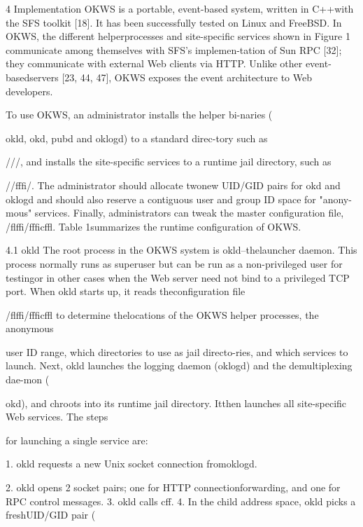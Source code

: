 4 Implementation
OKWS is a portable, event-based system, written in C++with the SFS toolkit [18]. It has been successfully tested
on Linux and FreeBSD. In OKWS, the different helperprocesses and site-specific services shown in Figure 1
communicate among themselves with SFS's implemen-tation of Sun RPC [32]; they communicate with external Web clients via HTTP. Unlike other event-basedservers [23, 44, 47], OKWS exposes the event architecture to Web developers.

To use OKWS, an administrator installs the helper bi-naries (

okld, okd, pubd and oklogd) to a standard direc-tory such as

/\Gamma \Delta \Theta /\Lambda \Xi \Pi \Sigma \Lambda /\Delta \Upsilon \Phi \Psi , and installs the site-specific services to a runtime jail directory, such as

/\Omega \Sigma \Theta /\Xi fffi\Delta /\Theta \Gamma \Psi . The administrator should allocate twonew UID/GID pairs for okd and oklogd and should also
reserve a contiguous user and group ID space for "anony-mous" services. Finally, administrators can tweak the
master configuration file, /flffi\Pi /\Xi fffi\Delta  \Pi \Xi \Psi c\Phi ffl. Table 1summarizes the runtime configuration of OKWS.

4.1 okld
The root process in the OKWS system is okld--thelauncher daemon. This process normally runs as superuser but can be run as a non-privileged user for testingor in other cases when the Web server need not bind to
a privileged TCP port. When okld starts up, it reads theconfiguration file

/flffi\Pi /\Xi fffi\Delta  \Pi \Xi \Psi c\Phi ffl to determine thelocations of the OKWS helper processes, the anonymous

user ID range, which directories to use as jail directo-ries, and which services to launch. Next, okld launches
the logging daemon (oklogd) and the demultiplexing dae-mon (

okd), and chroots into its runtime jail directory. Itthen launches all site-specific Web services. The steps

for launching a single service are:

1. okld requests a new Unix socket connection fromoklogd.

2. okld opens 2 socket pairs; one for HTTP connectionforwarding, and one for RPC control messages.
3. okld calls c\Xi \Theta ff.
4. In the child address space, okld picks a freshUID/GID pair (

